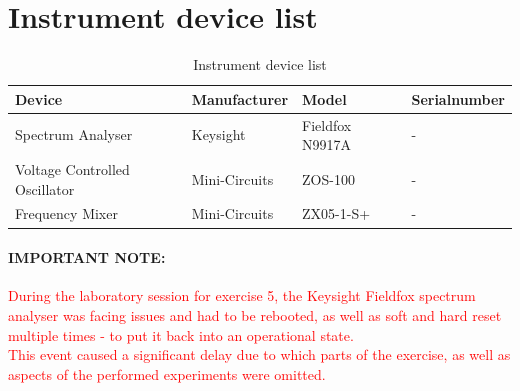 \section{Instrument device list}\label{sec:devicelist}
\begin{table}[h]
    \centering
    \begin{tabular}{|l |l |l |l |}
        \hline 
        \textbf{Device} & \textbf{Manufacturer} & \textbf{Model} & \textbf{Serialnumber} \\ \hline \hline
        Spectrum Analyser & Keysight & Fieldfox N9917A\cite{fieldfox} & - \\
         \hline
        Voltage Controlled Oscillator  & Mini-Circuits & ZOS-100\cite{mini1} & - \\
        \hline
        Frequency Mixer & Mini-Circuits & ZX05-1-S+\cite{mini2} & -  \\
        \hline

    \end{tabular}
    \captionsetup{justification=centering,singlelinecheck=true}
    \caption{Instrument device list}
\end{table}

\paragraph{IMPORTANT NOTE: }
\textcolor{red}{During the laboratory session for exercise 5, the Keysight Fieldfox spectrum analyser was facing issues and had to be rebooted, as well as soft and hard reset multiple times - to put it back into an operational state. \\This event caused a significant delay due to which parts of the exercise, as well as aspects of the performed experiments were omitted.} 
